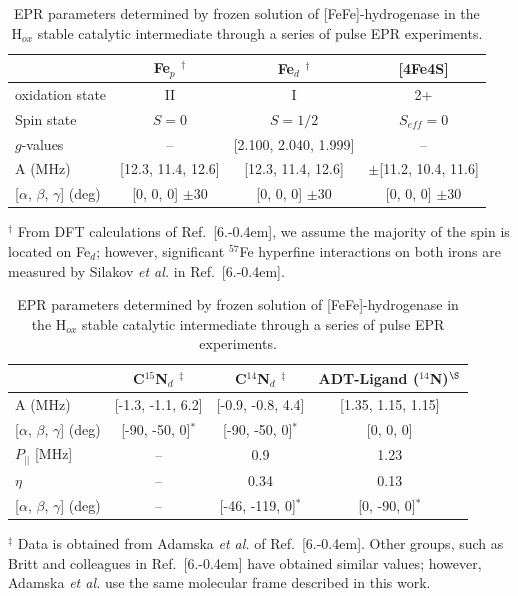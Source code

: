 \begin{table}[hb]
\caption[EPR parameters determined for FeFe-hydrogenase in Hox state.]{EPR parameters determined by frozen solution of [FeFe]-hydrogenase in the H$_{ox}$ stable catalytic intermediate through a series of pulse EPR experiments.}
\centering
\begin{tabular}{l|c|c||c}
 & Fe$_p$ $^\dagger$ & Fe$_d$ $^\dagger$ & {[}4Fe4S{]} \\ \hline \hline
oxidation state & II & I & 2+ \\
Spin state & $S=0$ & $S=1/2$ & $S_{eff}=0$ \\
$g$-values & -- & {[}2.100, 2.040, 1.999{]} & -- \\
A (MHz) & {[}12.3, 11.4, 12.6{]} & {[}12.3, 11.4, 12.6{]} & $\pm${[}11.2, 10.4, 11.6{]} \\
{[}$\alpha$, $\beta$, $\gamma${]} (deg) & {[}0, 0, 0{]} $\pm$30 & {[}0, 0, 0{]} $\pm$30 & {[}0, 0, 0{]} $\pm$30
\end{tabular}
\begin{flushleft}\footnotesize{$^\dagger$ From DFT calculations of Ref.~[6.\kern-0.4em], we assume the majority of the spin is located on Fe$_d$; however, significant $^{57}$Fe hyperfine interactions on both irons are measured by Silakov {\em et al.} in Ref.~[6.\kern-0.4em].} \end{flushleft}

\begin{tabular}{l|c|c|c}
& C$^{15}$N$_d$ $^\ddagger$ & C$^{14}$N$_d$ $^\ddagger$ & ADT-Ligand ($^{14}$N)$^{\S}$\\ \hline \hline
A (MHz) &  {[}-1.3, -1.1, 6.2{]} & {[}-0.9, -0.8, 4.4{]} & {[}1.35, 1.15, 1.15{]}\\
{[}$\alpha$, $\beta$, $\gamma${]} (deg) & {[}-90, -50, 0{]}$^\ast$ & {[}-90, -50, 0{]}$^\ast$ & {[}0, 0, 0{]}\\
$P_{||}$ {[}MHz{]} &  -- & 0.9 & 1.23\\ 
$\eta$ & -- & 0.34 & 0.13 \\
{[}$\alpha$, $\beta$, $\gamma${]} (deg) & -- & {[}-46, -119, 0{]}$^\ast$ & {[}0, -90, 0{]}$^\ast$
\end{tabular}
\begin{flushleft}\footnotesize{$^\ddagger$ Data is obtained from Adamska {\em et al.} of Ref.~[6.\kern-0.4em]. Other groups, such as Britt and colleagues in Ref.~[6.\kern-0.4em] have obtained similar values; however, Adamska {\em et al.} use the same molecular frame described in this work. 

}
\end{flushleft}
\end{table}
